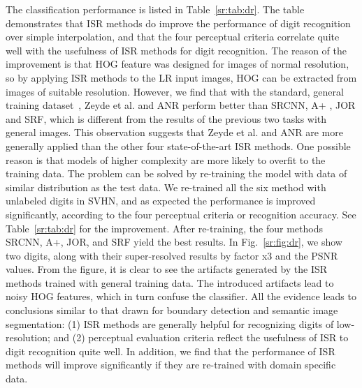 The classification performance is listed in Table~\ref{sr:tab:dr}. The table demonstrates that ISR methods do improve the
performance of digit recognition over simple interpolation, and that
the four perceptual criteria correlate quite well with the usefulness
of ISR methods for digit recognition. The reason of the improvement is
that HOG feature was designed for images of normal resolution, so by
applying ISR methods to the LR input images, HOG can be extracted from
images of suitable resolution.  However, we find that with the
standard, general training dataset~\citep{Yang-TIP-2010}, Zeyde et
al. and ANR perform better than SRCNN, A+ , JOR and SRF, which is different
from the results of the previous two tasks with general images. This observation
suggests that Zeyde et al. and ANR are more generally applied than the
other four state-of-the-art ISR methods. One possible reason is that models 
of higher complexity are more likely to overfit to the training data. 
The problem can be solved by
re-training the model with data of similar distribution as the test data. We re-trained
all the six method with unlabeled digits in SVHN, and as expected the
performance is improved significantly, according to the four perceptual criteria or 
recognition accuracy. See Table~\ref{sr:tab:dr} for the improvement. After re-training, 
the four methods SRCNN, A+, JOR, and SRF yield the best results.  
 In Fig.~\ref{sr:fig:dr}, we show
two digits, along with their super-resolved results by factor x3
and the PSNR values. From the figure, it is clear to see the artifacts
generated by the ISR methods trained with general training data. The
introduced artifacts lead to noisy HOG features, which in turn confuse
the classifier. All the evidence leads to conclusions similar to that
drawn for boundary detection and semantic image segmentation: (1) ISR methods are
generally helpful for recognizing digits of low-resolution; and (2)
perceptual evaluation criteria reflect the usefulness of ISR
to digit recognition quite well.  In addition, we find that the performance of
ISR methods will improve significantly if they are re-trained with domain specific
data.


